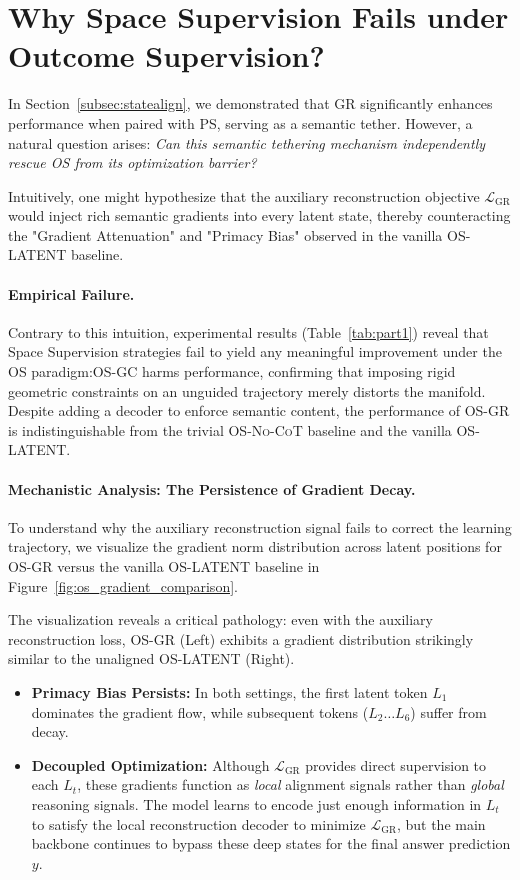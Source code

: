 \newpage
\section{Why Space Supervision Fails under Outcome Supervision?}
\label{app:c}

In Section~\ref{subsec:statealign}, we demonstrated that GR significantly enhances performance when paired with PS, serving as a semantic tether. However, a natural question arises: \textit{Can this semantic tethering mechanism independently rescue OS from its optimization barrier?}

Intuitively, one might hypothesize that the auxiliary reconstruction objective $\mathcal{L}_{\text{GR}}$ would inject rich semantic gradients into every latent state, thereby counteracting the "Gradient Attenuation" and "Primacy Bias" observed in the vanilla OS-LATENT baseline.

\paragraph{Empirical Failure.} 
Contrary to this intuition, experimental results (Table~\ref{tab:part1}) reveal that Space Supervision strategies fail to yield any meaningful improvement under the OS paradigm:OS-GC harms performance, confirming that imposing rigid geometric constraints on an unguided trajectory merely distorts the manifold.
Despite adding a decoder to enforce semantic content, the performance of \textsc{OS-GR} is indistinguishable from the trivial \textsc{OS-No-CoT} baseline and the vanilla \textsc{OS-LATENT}.

\paragraph{Mechanistic Analysis: The Persistence of Gradient Decay.}
To understand why the auxiliary reconstruction signal fails to correct the learning trajectory, we visualize the gradient norm distribution across latent positions for \textsc{OS-GR} versus the vanilla \textsc{OS-LATENT} baseline in Figure~\ref{fig:os_gradient_comparison}.

The visualization reveals a critical pathology: even with the auxiliary reconstruction loss, OS-GR (Left) exhibits a gradient distribution strikingly similar to the unaligned OS-LATENT (Right).
\begin{itemize}
    \item \textbf{Primacy Bias Persists:} In both settings, the first latent token $L_1$ dominates the gradient flow, while subsequent tokens ($L_2 \dots L_6$) suffer from decay.
    \item \textbf{Decoupled Optimization:} Although $\mathcal{L}_{\text{GR}}$ provides direct supervision to each $L_t$, these gradients function as \textit{local} alignment signals rather than \textit{global} reasoning signals. The model learns to encode just enough information in $L_t$ to satisfy the local reconstruction decoder to minimize $\mathcal{L}_{\text{GR}}$, but the main backbone continues to bypass these deep states for the final answer prediction $y$.
\end{itemize}

